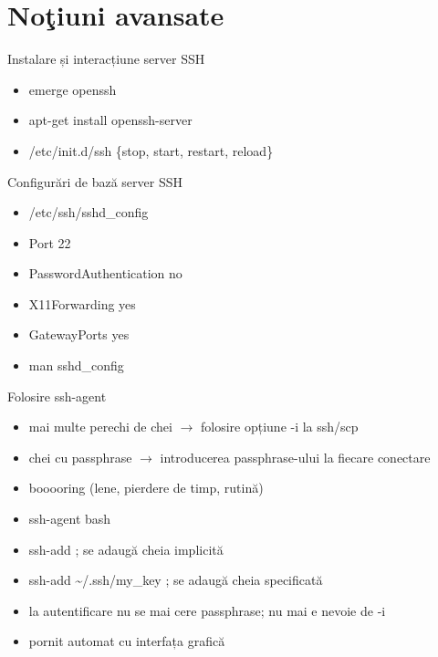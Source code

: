 \documentclass{beamer}
\begin{document}
\section{No\c{t}iuni avansate}
\frame{\tableofcontents[currentsection]}

\begin{frame}{Instalare și interacțiune server SSH}
  \begin{itemize}
  	\item emerge openssh
    \item apt-get install openssh-server
    \item /etc/init.d/ssh \{stop, start, restart, \pause reload\}
  \end{itemize}
\end{frame}

\begin{frame}{Configurări de bază server SSH}
  \begin{itemize}
    \item /etc/ssh/sshd\_config
    \item Port 22
    \item PasswordAuthentication no
    \item X11Forwarding yes
	\item GatewayPorts yes
    \item man sshd\_config
  \end{itemize}
\end{frame}

\begin{frame}{Folosire ssh-agent}
  \begin{itemize}
    \item mai multe perechi de chei $\rightarrow$ folosire opțiune -i la ssh/scp
    \item chei cu passphrase $\rightarrow$ introducerea passphrase-ului la fiecare conectare
    \item booooring (lene, pierdere de timp, rutină)
	\item ssh-agent bash
    \item ssh-add    ; se adaugă cheia implicită
    \item ssh-add \~{}/.ssh/my\_key    ; se adaugă cheia specificată
    \item la autentificare nu se mai cere passphrase; nu mai e nevoie de -i
    \item pornit automat cu interfața grafică
  \end{itemize}
\end{frame}
\end{document}

